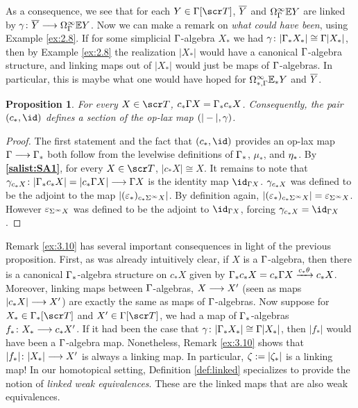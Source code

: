 \documentclass{amsart}
\newtheorem{prop}[thm]{Proposition}
\theoremstyle{definition}
\begin{document}
As a consequence, we see that for each $Y \in \GA [\sT]$, $\overline{Y}$ and $\Omega^{\infty}_{\Gamma} \mathbb{E} Y$ are linked by $\gamma \colon \overline{Y} \longrightarrow \Omega^{\infty}_{\Gamma} \mathbb{E} Y$. Now we can make a remark on \emph{what could have been}, using Example \ref{ex:2.8}. If for some simplicial $\Gamma$-algebra $X_*$ we had $\gamma \colon |\Gamma_* X_*| \cong \Gamma |X_*|$, then by Example \ref{ex:2.8} the realization $|X_*|$ would have a canonical $\Gamma$-algebra structure, and linking maps out of $|X_*|$ would just be maps of $\Gamma$-algebras.
In particular, this is maybe what one would have hoped for $\Omega^{\infty}_{*,\Gamma} \mathbb{E}_* Y$ and $\overline{Y}$.

\begin{prop}
    For every $X \in \sT$, $c_* \Gamma X = \Gamma_* c_* X$. Consequently, the pair $(c_*,\id)$ defines a section of the op-lax map $(|-|,\gamma)$.
\end{prop}
\begin{proof}
The first statement and the fact that $(c_*,\id)$ provides an op-lax map $\Gamma \longrightarrow \Gamma_*$ both follow from the levelwise definitions of $\Gamma_*$, $\mu_*$, and $\eta_*$. By \textbf{\ref{salist:SA1}}, for every $X \in \sT$, $|c_* X| \cong X$. It remains to note that $\gamma_{c_* X} \colon |\Gamma_* c_* X| = |c_* \Gamma X| \longrightarrow \Gamma X$ is the identity map $\id_{\GA X}$. $\gamma_{c_* X}$ was defined to be the adjoint to the map $|(\varepsilon_*)_{c_* \Sigma^{\infty}X}|$. By definition again, $|(\varepsilon_*)_{c_* \Sigma^{\infty}X}| = \varepsilon_{\Sigma^{\infty}X}$. However $\varepsilon_{\Sigma^{\infty} X}$
was defined to be the adjoint to $\id_{\GA X}$, forcing $\ga_{c_* X} = \id_{\GA X}$. 
\end{proof}

Remark \ref{ex:3.10} has several important consequences in light of the previous proposition. First, as was already intuitively clear, if $X$ is a $\Gamma$-algebra, then there is a canonical $\Gamma_*$-algebra structure on $c_* X$ given by $\Gamma_* c_* X = c_* \Gamma X \xrightarrow{c_* \theta} c_* X$. Moreover, linking maps between $\Gamma$-algebras, $X \longrightarrow X'$ (seen as maps $|c_* X| \longrightarrow X'$) are exactly the same as maps of $\Gamma$-algebras. 
Now suppose for $X_* \in \GA_* [\sT]$ and $X' \in \GA [\sT]$, we had a map of $\Gamma_*$-algebras $f_* \colon X_* \longrightarrow c_* X'$. If it had been the case that $\gamma \colon |\Gamma_* X_*| \cong \Gamma |X_*|$, then $|f_*|$ would have been a $\Gamma$-algebra map. Nonetheless, Remark \ref{ex:3.10} shows that $|f_*| \colon |X_*| \longrightarrow X'$ is always a linking map. In particular, $\zeta := |\zeta_*|$ is a linking map! In our homotopical setting, Definition \ref{def:linked} specializes to provide the notion of \emph{linked weak equivalences}. These are the linked maps that are also weak equivalences.\\
\end{document}

